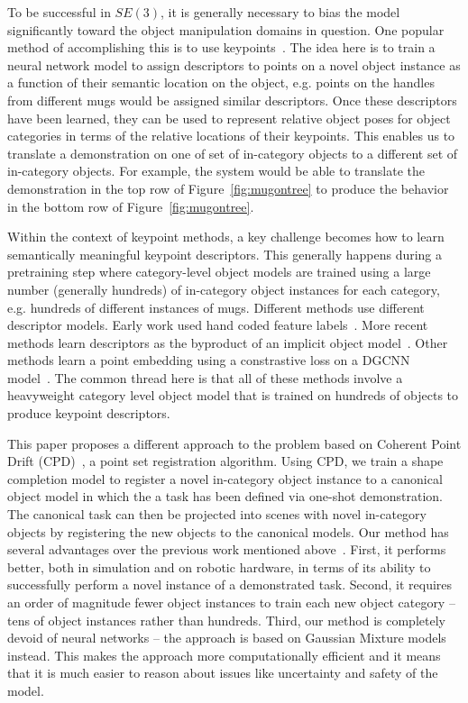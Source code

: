 \documentclass{article}
\begin{document}
To be successful in $SE(3)$, it is generally necessary to bias the model significantly toward the object manipulation domains in question. One popular method of accomplishing this is to use keypoints~\cite{pan2022tax,wang2019dynamic,manuelli2019kpam}. The idea here is to train a neural network model to assign descriptors to points on a novel object instance as a function of their semantic location on the object, e.g. points on the handles from different mugs would be assigned similar descriptors. Once these descriptors have been learned, they can be used to represent relative object poses for object categories in terms of the relative locations of their keypoints. This enables us to translate a demonstration on one of set of in-category objects to a different set of in-category objects. For example, the system would be able to translate the demonstration in the top row of Figure~\ref{fig:mugontree} to produce the behavior in the bottom row of Figure~\ref{fig:mugontree}.

Within the context of keypoint methods, a key challenge becomes how to learn semantically meaningful keypoint descriptors. This generally happens during a pretraining step where category-level object models are trained using a large number (generally hundreds) of in-category object instances for each category, e.g. hundreds of different instances of mugs. Different methods use different descriptor models. Early work used hand coded feature labels~\cite{manuelli2019kpam}. More recent methods learn descriptors as the byproduct of an implicit object model~\cite{simeonov2022neural}. Other methods learn a point embedding using a constrastive loss on a DGCNN~\cite{wang2019dynamic} model~\cite{pan2022tax}. The common thread here is that all of these methods involve a heavyweight category level object model that is trained on hundreds of objects to produce keypoint descriptors.

This paper proposes a different approach to the problem based on Coherent Point Drift (CPD)~\cite{myronenko2010point}, a point set registration algorithm. Using CPD, we train a shape completion model to register a novel in-category object instance to a canonical object model in which the a task has been defined via one-shot demonstration. The canonical task can then be projected into scenes with novel in-category objects by registering the new objects to the canonical models. Our method has several advantages over the previous work mentioned above~\cite{pan2022tax,wang2019dynamic,manuelli2019kpam}. First, it performs better, both in simulation and on robotic hardware, in terms of its ability to successfully perform a novel instance of a demonstrated task. Second, it requires an order of magnitude fewer object instances to train each new object category -- tens of object instances rather than hundreds. Third, our method is completely devoid of neural networks -- the approach is based on Gaussian Mixture models instead. This makes the approach more computationally efficient and it means that it is much easier to reason about issues like uncertainty and safety of the model. 
\end{document}

